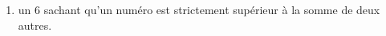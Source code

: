 \documentclass[a4paper]{tp_um}
\begin{document}
\begin{enumerate}
\begin{enumerate}

            \item un $6$ sachant qu'un numéro est strictement supérieur à la somme de deux autres.
		\vspace*{10cm}


        \end{enumerate}
\end{enumerate}
\end{document}
